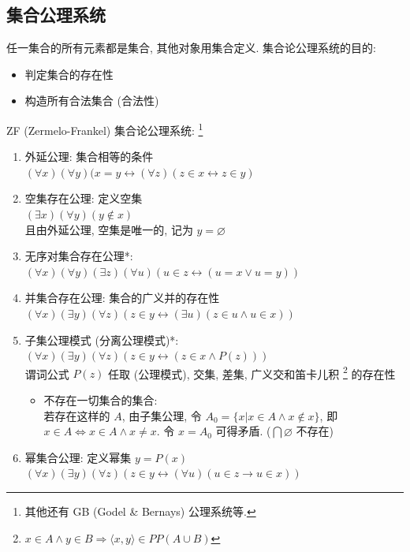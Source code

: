 \documentclass[11pt,a4paper,twocolumn,fleqn]{article} %
\renewcommand{\emptyset}{\varnothing}
\begin{document}
\subsection{集合公理系统} %
\label{sub:set_axiom}
任一集合的所有元素都是集合, 其他对象用集合定义. 集合论公理系统的目的: 
\begin{itemize}
	\item 判定集合的存在性
	\item 构造所有合法集合 (合法性)
\end{itemize}
ZF (Zermelo-Frankel) 集合论公理系统: 
\footnote{其他还有 GB (Godel \& Bernays) 公理系统等.}
\begin{enumerate}
	\item 外延公理: 集合相等的条件\\
	$(\forall x)(\forall y)(x=y \leftrightarrow 
	(\forall z)(z\in x \leftrightarrow z\in y)$
	\item 空集存在公理: 定义空集 \\
	$(\exists x)(\forall y)(y\notin x)$ \\
	且由外延公理, 空集是唯一的, 记为 $y=\emptyset$
	\item 无序对集合存在公理*: \label{pair_exist}\\
	$(\forall x)(\forall y)(\exists z)(\forall u)
	(u\in z \leftrightarrow (u=x\lor u=y) )$
	\item 并集合存在公理: 集合的广义并的存在性\\
	$(\forall x)(\exists y)(\forall z)(z\in y \leftrightarrow 
	(\exists u)(z\in u \land u\in x))$
	\item 子集公理模式 (分离公理模式)*: \label{subset_form}\\
	$(\forall x)(\exists y)(\forall z)(z\in y 
	\leftrightarrow (z\in x \land P(z)))$\\
	谓词公式 $P(z)$ 任取 (公理模式), 
	交集, 差集, 广义交和笛卡儿积
	\footnote{$x\in A \land y\in B \Rightarrow\langle x, y \rangle \in PP(A\cup B)$}
	的存在性
	\begin{itemize}
		\item 不存在一切集合的集合: \\
		若存在这样的 $A$, 由子集公理, 令 $A_0 = \{x|x\in A\land x\notin x\}$, 
		即 $x\in A \Leftrightarrow x\in A\land x\neq x$. 令 $x = A_0$ 可得矛盾. 
		($\bigcap \emptyset$ 不存在)
	\end{itemize}
	\item 幂集合公理: 定义幂集 $y = P(x)$\\
	$(\forall x)(\exists y)(\forall z)(z\in y \leftrightarrow
	(\forall u)(u\in z \to u \in x))$

\end{enumerate}
\end{document}

